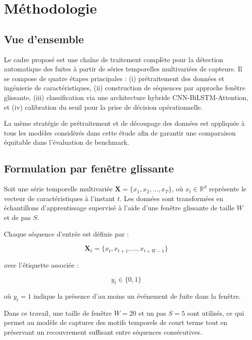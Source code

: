 \section{Méthodologie}

\subsection{Vue d'ensemble}

Le cadre proposé est une chaîne de traitement complète pour la détection
automatique des fuites à partir de séries temporelles multivariées de capteurs.
Il se compose de quatre étapes principales : (i) prétraitement des données et
ingénierie de caractéristiques, (ii) construction de séquences par approche
fenêtre glissante, (iii) classification via une architecture hybride
CNN-BiLSTM-Attention, et (iv) calibration du seuil pour la prise de décision
opérationnelle.

La même stratégie de prétraitement et de découpage des données est appliquée à
tous les modèles considérés dans cette étude afin de garantir une comparaison
équitable dans l'évaluation de benchmark.

\subsection{Formulation par fenêtre glissante}

Soit une série temporelle multivariée $\mathbf{X} = \{x_1, x_2, \dots, x_T\}$,
où $x_t \in \mathbb{R}^d$ représente le vecteur de caractéristiques à l'instant
$t$. Les données sont transformées en échantillons d'apprentissage supervisé à
l'aide d'une fenêtre glissante de taille $W$ et de pas $S$.

Chaque séquence d'entrée est définie par :

\begin{equation}
\mathbf{X}_t = \{x_t, x_{t+1}, \dots, x_{t+W-1}\}
\end{equation}

avec l'étiquette associée :

\begin{equation}
y_t \in \{0,1\}
\end{equation}

où $y_t = 1$ indique la présence d'au moins un événement de fuite dans la fenêtre.

Dans ce travail, une taille de fenêtre $W = 20$ et un pas $S = 5$ sont utilisés,
ce qui permet au modèle de capturer des motifs temporels de court terme tout en
préservant un recouvrement suffisant entre séquences consécutives.

